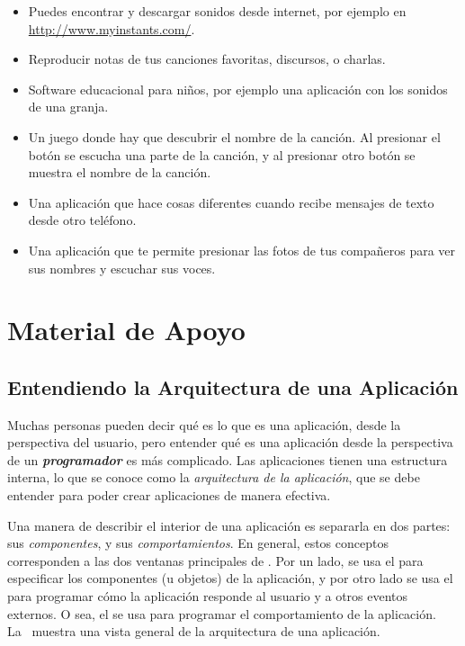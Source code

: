 \documentclass[letterpaper]{article}
\begin{document}
\begin{itemize}

\item Puedes encontrar y descargar sonidos desde internet, por ejemplo
  en \url{http://www.myinstants.com/}.

\item Reproducir notas de tus canciones favoritas, discursos, o charlas.

\item Software educacional para niños, por ejemplo una aplicación con
  los sonidos de una granja.

\item Un juego donde hay que descubrir el nombre de la canción. Al
  presionar el botón se escucha una parte de la canción, y al
  presionar otro botón se muestra el nombre de la canción.

\item Una aplicación que hace cosas diferentes cuando recibe mensajes
  de texto desde otro teléfono.

\item Una aplicación que te permite presionar las fotos de tus
  compañeros para ver sus nombres y escuchar sus voces.

\end{itemize}

\section{Material de Apoyo}
\label{sec:material-de-apoyo}

\subsection*{Entendiendo la Arquitectura de una Aplicación}

Muchas personas pueden decir qué es lo que es una aplicación, desde la
perspectiva del usuario, pero entender qué es una aplicación desde la
perspectiva de un \textit{\textbf{programador}} es más complicado. Las
aplicaciones tienen una estructura interna, lo que se conoce como la
\emph{arquitectura de la aplicación}, que se debe entender para poder
crear aplicaciones de manera efectiva.

Una manera de describir el interior de una aplicación es separarla en
dos partes: sus \emph{componentes}, y sus \emph{comportamientos}. En
general, estos conceptos corresponden a las dos ventanas principales
de \AppInventor. Por un lado, se usa el \componentDesigner para
especificar los componentes (u objetos) de la aplicación, y por otro
lado se usa el \blockEditor para programar cómo la aplicación responde
al usuario y a otros eventos externos. O sea, el \blockEditor se usa
para programar el comportamiento de la aplicación. La~
muestra una vista general de la arquitectura de una aplicación.
\end{document}
